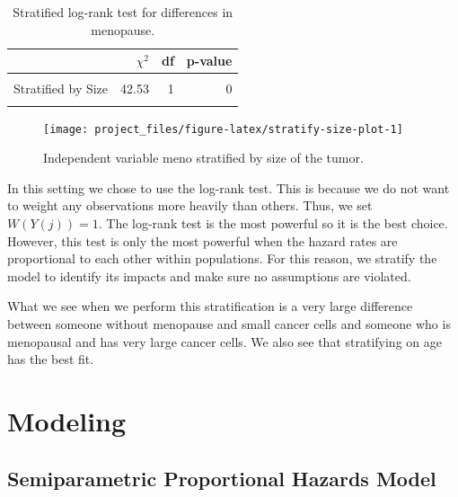 \documentclass[
]{article}
\begin{document}
\begin{table}[!h]

\caption{\label{tab:stratify}Stratified log-rank test for differences in menopause.}
\centering
\fontsize{10}{12}\selectfont
\begin{tabular}[t]{lrrr}
\toprule
  & $\chi^2$ & df & p-value\\
\midrule
\cellcolor{gray!6}{Stratified by Chemo} & \cellcolor{gray!6}{69.59} & \cellcolor{gray!6}{1} & \cellcolor{gray!6}{0}\\
Stratified by Size & 42.53 & 1 & 0\\
\cellcolor{gray!6}{Stratified by Hormon} & \cellcolor{gray!6}{44.06} & \cellcolor{gray!6}{1} & \cellcolor{gray!6}{0}\\
\bottomrule
\end{tabular}
\end{table}

\begin{figure}[H]

{\centering \texttt{[image: project\_files/figure-latex/stratify-size-plot-1]} 

}

\caption{Independent variable meno stratified by size of the tumor.}\label{fig:stratify-size-plot}
\end{figure}

In this setting we chose to use the log-rank test. This is because we do not want to weight any observations more heavily than others. Thus, we set \(W(Y(j)) = 1\). The log-rank test is the most powerful so it is the best choice. However, this test is only the most powerful when the hazard rates are proportional to each other within populations. For this reason, we stratify the model to identify its impacts and make sure no assumptions are violated.

What we see when we perform this stratification is a very large difference between someone without menopause and small cancer cells and someone who is menopausal and has very large cancer cells. We also see that stratifying on age has the best fit.

\section{Modeling}

\subsection {Semiparametric Proportional Hazards Model}
\end{document}
